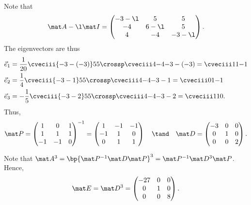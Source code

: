 \begin{solution}
    Note that \[\mat A - \l \mat I = \begin{pmatrix}-3-\l & 5 & 5 \\ -4 & 6-\l & 5 \\ 4 & -4 & -3-\l\end{pmatrix}.\] The eigenvectors are thus
    \begin{align*}
        \vec e_1 &= \frac1{20} \cveciii{-3-(-3)}55 \crossp \cveciii4{-4}{-3-(-3)} = \cveciii11{-1}\\
        \vec e_2 &= \frac1{4} \cveciii{-3-1}55 \crossp \cveciii4{-4}{-3-1} = \cveciii01{-1}\\
        \vec e_3 &= -\frac1{5} \cveciii{-3-2}55 \crossp \cveciii4{-4}{-3-2} = \cveciii110.
    \end{align*}
    Thus, \[\mat P = \begin{pmatrix}1 & 0 & 1 \\ 1 & 1 & 1 \\ -1 & -1 & 0\end{pmatrix}^{-1} = \begin{pmatrix}1 & -1 & -1 \\ -1 & 1 & 0 \\ 0 & 1 & 1\end{pmatrix} \quad \tand \quad \mat D = \begin{pmatrix}-3 & 0 & 0 \\ 0 & 1 & 0 \\ 0 & 0 & 2\end{pmatrix}.\]

    Note that $\mat A^3 = \bp{\mat P^{-1} \mat D \mat P}^3 = \mat P^{-1} \mat D^3 \mat P$. Hence, \[\mat E = \mat D^3 = \begin{pmatrix}-27 & 0 & 0 \\ 0 & 1 & 0 \\ 0 & 0 & 8\end{pmatrix}.\]
\end{solution}

